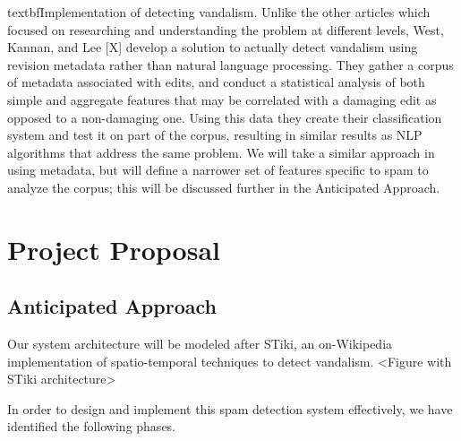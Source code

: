 \documentclass[letterpaper]{sig-alternate}
\begin{document}
textbf{Implementation of detecting vandalism.} Unlike the other articles which focused on researching and understanding the problem at different levels, West, Kannan, and Lee [X] develop a solution to actually detect vandalism using revision metadata rather than natural language processing. They gather a corpus of metadata associated with edits, and conduct a statistical analysis of both simple and aggregate features that may be correlated with a damaging edit as opposed to a non-damaging one. Using this data they create their classification system and test it on part of the corpus, resulting in similar results as NLP algorithms that address the same problem. We will take a similar approach in using metadata, but will define a narrower set of features specific to spam to analyze the corpus; this will be discussed further in the Anticipated Approach.

\section{Project Proposal}
\label{sec:project_proposal}

\subsection{Anticipated Approach}
\label{subsec:approach}
Our system architecture will be modeled after STiki, an on-Wikipedia implementation of spatio-temporal techniques to detect vandalism. <Figure with STiki architecture>

In order to design and implement this spam detection system effectively, we have identified the following phases.
\end{document}
